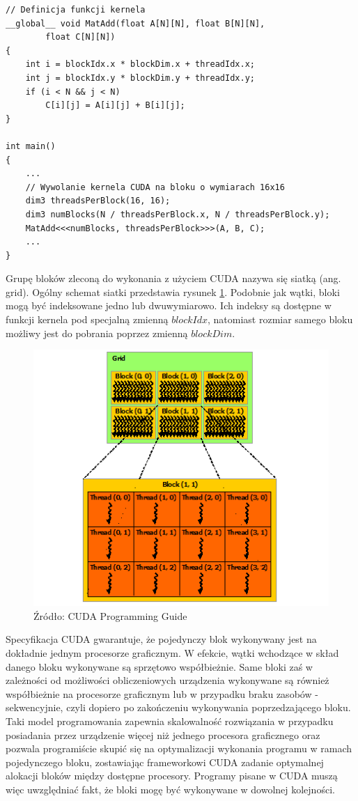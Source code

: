 \begin{lstlisting}[caption=Dodawanie macierzy, label=kernel]
// Definicja funkcji kernela
__global__ void MatAdd(float A[N][N], float B[N][N],
		float C[N][N])
{
	int i = blockIdx.x * blockDim.x + threadIdx.x;
	int j = blockIdx.y * blockDim.y + threadIdx.y;
	if (i < N && j < N)
		C[i][j] = A[i][j] + B[i][j];
}

int main()
{
	...
	// Wywolanie kernela CUDA na bloku o wymiarach 16x16
	dim3 threadsPerBlock(16, 16);
	dim3 numBlocks(N / threadsPerBlock.x, N / threadsPerBlock.y);
	MatAdd<<<numBlocks, threadsPerBlock>>>(A, B, C);
	...
}
\end{lstlisting}

Grupę bloków zleconą do wykonania z użyciem CUDA nazywa się siatką
(ang. grid). Ogólny schemat siatki przedstawia rysunek \ref{grid}. Podobnie jak
wątki, bloki mogą być indeksowane jedno lub dwuwymiarowo. Ich indeksy są dostępne
w funkcji kernela pod specjalną zmienną $blockIdx$, natomiast rozmiar samego
bloku możliwy jest do pobrania poprzez zmienną $blockDim$.

\begin{figure}[H]
\centering
\includegraphics[scale=0.8]{images/grid-of-thread-blocks.png}
\caption{Źródło: CUDA Programming Guide}
\label{grid}
\end{figure}

Specyfikacja CUDA gwarantuje, że pojedynczy blok wykonywany jest na
dokładnie jednym procesorze graficznym. W efekcie, wątki wchodzące w
skład danego bloku wykonywane są sprzętowo współbieżnie. Same bloki zaś w zależności od
możliwości obliczeniowych urządzenia wykonywane są również
współbieżnie na procesorze graficznym lub w przypadku braku zasobów -
sekwencyjnie, czyli dopiero po
zakończeniu wykonywania poprzedzającego bloku. Taki model programowania zapewnia
skalowalność rozwiązania w przypadku posiadania przez urządzenie więcej niż
jednego procesora graficznego oraz pozwala programiście skupić się na
optymalizacji wykonania programu w ramach pojedynczego bloku, zostawiając frameworkowi CUDA
zadanie optymalnej alokacji bloków między dostępne procesory.
 Programy pisane w CUDA muszą więc uwzględniać fakt,
że bloki mogę być wykonywane w dowolnej kolejności. 


